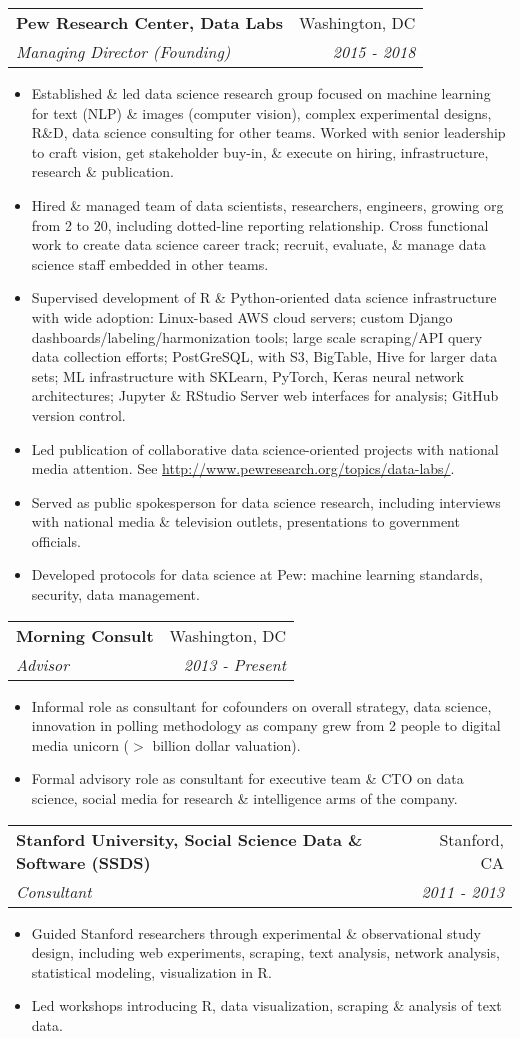 \documentclass[letterpaper,11pt]{article}
\makeatletter
\newcommand{\resitem}[1]{\item #1 \vspace{-6pt}}
\newcommand{\ressubheading}[4]{\vspace{2pt}
\begin{tabular*}{7.58in}{l@{\extracolsep{\fill}}r}
		\textbf{#1} & #2 \\
		\textit{#3} & \textit{#4} \\
\end{tabular*}\vspace{-1pt}}
\makeatother
\begin{document}
\ressubheading{Pew Research Center, Data Labs}{Washington, DC}{Managing Director (Founding)}{2015 - 2018}
	\begin{itemize}
		\resitem{Established \& led data science research group focused on machine learning for text (NLP) \& images (computer vision), complex experimental designs, R\&D, data science consulting for other teams. Worked with senior leadership to craft vision, get stakeholder buy-in, \& execute on hiring, infrastructure, research \& publication.}
        \resitem{Hired \& managed team of data scientists, researchers, engineers, growing org from 2 to 20, including dotted-line reporting relationship. Cross functional work to create data science career track; recruit, evaluate, \& manage data science staff embedded in other teams.}
        \resitem{Supervised development of R \& Python-oriented data science infrastructure with wide adoption: Linux-based AWS cloud servers; custom Django dashboards/labeling/harmonization tools; large scale scraping/API query data collection efforts; PostGreSQL, with S3, BigTable, Hive for larger data sets; ML infrastructure with SKLearn, PyTorch, Keras neural network architectures; Jupyter \& RStudio Server web interfaces for analysis; GitHub version control.}
        \resitem{Led publication of collaborative data science-oriented projects with national media attention. See \url{http://www.pewresearch.org/topics/data-labs/}.}
        \resitem{Served as public spokesperson for data science research, including interviews with national media \& television outlets, presentations to government officials.}
		\resitem{Developed protocols for data science at Pew: machine learning standards, security, data management.}
	\end{itemize}

\ressubheading{Morning Consult}{Washington, DC}{Advisor}{2013 - Present}
	\begin{itemize}
		\resitem{Informal role as consultant for cofounders on overall strategy, data science, innovation in polling methodology as company grew from 2 people to digital media unicorn ($>$ billion dollar valuation).}
		\resitem{Formal advisory role as consultant for executive team \& CTO on data science, social media for research \& intelligence arms of the company.}	
    \end{itemize}

\ressubheading{Stanford University, Social Science Data \& Software (SSDS)}{Stanford, CA}{Consultant}{2011 - 2013}
	\begin{itemize}
		\resitem{Guided Stanford researchers through experimental \& observational study design, including web experiments, scraping, text analysis, network analysis, statistical modeling, visualization in R.}
		\resitem{Led workshops introducing R, data visualization, scraping \& analysis of text data.} 
	\end{itemize}
\end{document}
